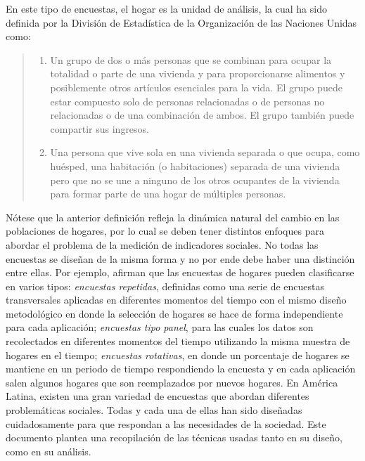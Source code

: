 \documentclass[12pt,spanish,]{book}
\providecommand{\tightlist}{%
  \setlength{\itemsep}{0pt}\setlength{\parskip}{0pt}}
\begin{document}
En este tipo de encuestas, el hogar es la unidad de análisis, la cual ha sido definida por la División de Estadística de la Organización de las Naciones Unidas \autocite{United-Nations_2011} como:

\begin{quote}
\begin{enumerate}
\def\labelenumi{\alph{enumi}.}
\tightlist
\item
  Un grupo de dos o más personas que se combinan para ocupar la totalidad o parte de una vivienda y para proporcionarse alimentos y posiblemente otros artículos esenciales para la vida. El grupo puede estar compuesto solo de personas relacionadas o de personas no relacionadas o de una combinación de ambos. El grupo también puede compartir sus ingresos.
\item
  Una persona que vive sola en una vivienda separada o que ocupa, como huésped, una habitación (o habitaciones) separada de una vivienda pero que no se une a ninguno de los otros ocupantes de la vivienda para formar parte de una hogar de múltiples personas.
\end{enumerate}
\end{quote}

Nótese que la anterior definición refleja la dinámica natural del cambio en las poblaciones de hogares, por lo cual se deben tener distintos enfoques para abordar el problema de la medición de indicadores sociales. No todas las encuestas se diseñan de la misma forma y no por ende debe haber una distinción entre ellas. Por ejemplo, \textcite{Kalton_Citro_1993} afirman que las encuestas de hogares pueden clasificarse en varios tipos: \emph{encuestas repetidas}, definidas como una serie de encuestas transversales aplicadas en diferentes momentos del tiempo con el mismo diseño metodológico en donde la selección de hogares se hace de forma independiente para cada aplicación; \emph{encuestas tipo panel}, para las cuales los datos son recolectados en diferentes momentos del tiempo utilizando la misma muestra de hogares en el tiempo; \emph{encuestas rotativas}, en donde un porcentaje de hogares se mantiene en un periodo de tiempo respondiendo la encuesta y en cada aplicación salen algunos hogares que son reemplazados por nuevos hogares. En América Latina, existen una gran variedad de encuestas que abordan diferentes problemáticas sociales. Todas y cada una de ellas han sido diseñadas cuidadosamente para que respondan a las necesidades de la sociedad. Este documento plantea una recopilación de las técnicas usadas tanto en su diseño, como en su análisis.
\end{document}
